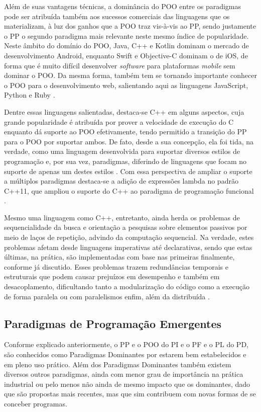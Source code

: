 Além de suas vantagens técnicas, a dominância do POO entre os paradigmas pode
ser atribuída também aos sucessos comerciais das linguagens que os materializam,
à luz dos ganhos que a POO traz vis-à-vis ao PP, sendo justamente o PP o segundo
paradigma mais relevante neste mesmo índice de popularidade. Neste âmbito  do
domínio do POO, Java, C++ e Kotlin dominam o mercado de desenvolvimento Android,
enquanto Swift e Objective-C dominam o de iOS, de forma que é muito difícil
desenvolver \textit{software} para plataformas \textit{mobile} sem dominar o
POO. Da mesma forma, também tem se tornando importante conhecer o POO para o
desenvolvimento web, salientando aqui as linguagens JavaScript, Python e Ruby
\cite{gwosdz_2020}.

Dentre essas linguagens salientadas, destaca-se C++ em alguns aspectos, cuja
grande popularidade é atribuída por prover a velocidade de execução do C
enquanto dá suporte ao POO efetivamente, tendo permitido a transição do
PP para o POO por suportar ambos. De fato, desde a sua concepção, ela foi tida,
na verdade, como uma linguagem desenvolvida para suportar diversos estilos de
programação e, por sua vez, paradigmas, diferindo de linguagens que focam no
suporte de apenas um destes estilos \cite{bjarne_1995}. Com essa perspectiva de
ampliar o suporte a múltiplos paradigmas destaca-se a adição de expressões
lambda no padrão C++11, que ampliou o suporte do C++ ao paradigma de programação
funcional \cite{bjarne_2020}.

Mesmo uma linguagem como C++, entretanto, ainda herda os problemas de
sequencialidade da busca e orientação a pesquisas sobre elementos passivos por
meio de laços de repetição, advindo da computação sequencial. Na verdade, estes
problemas afetam desde linguagens imperativas até declarativas, sendo que estas
últimas, na prática, são implementadas com base nas primeiras finalmente,
conforme já discutido. Esses problemas trazem redundâncias temporais e
estruturais que podem causar prejuízos em desempenho e também em desacoplamento,
dificultando tanto a modularização do código como a execução de forma paralela
ou com paralelismos enfim, além da distribuída
\cite{simao_2009,simao_2012a,doc_ronszcka_2019}.

\subsection{Paradigmas de Programação Emergentes}\label{sec:intro_emergentes}

Conforme explicado anteriormente, o PP e o POO do PI e o PF e o PL do PD, são
conhecidos como Paradigmas Dominantes por estarem bem estabelecidos e em pleno
uso prático. Além dos Paradigmas Dominantes também existem diversos outros
paradigmas, ainda com menor grau de importância na prática industrial ou pelo
menos não ainda de mesmo impacto que os dominantes, dado que são propostas mais
recentes, mas que sim contribuem com novas formas de se conceber programas.


